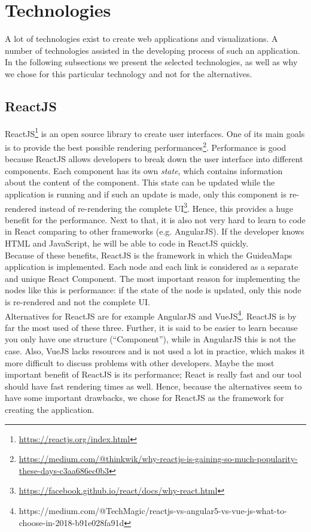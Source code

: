 \section{Technologies}\label{sec:technologies}
A lot of technologies exist to create web applications and visualizations. A number of technologies assisted in the developing process of such an application. In the following subsections we present the selected technologies, as well as why we chose for this particular technology and not for the alternatives.

\subsection{ReactJS}\label{sec:reactjs}
ReactJS\footnote{\url{https://reactjs.org/index.html}} is an open source library to create user interfaces. One of its main goals is to provide the best possible rendering performances\footnote{\url{https://medium.com/@thinkwik/why-reactjs-is-gaining-so-much-popularity-these-days-c3aa686ec0b3}}. Performance is good because ReactJS allows developers to break down the user interface into different components. Each component has its own \textit{state}, which contains information about the content of the component. This state can be updated while the application is running and if such an update is made, only this component is re-rendered instead of re-rendering the complete UI\footnote{\url{https://facebook.github.io/react/docs/why-react.html}}. Hence, this provides a huge benefit for the performance. Next to that, it is also not very hard to learn to code in React comparing to other frameworks (e.g. AngularJS). If the developer knows HTML and JavaScript, he will be able to code in ReactJS quickly.\\

Because of these benefits, ReactJS is the framework in which the GuideaMaps application is implemented. Each node and each link is considered as a separate and unique React Component. The most important reason for implementing the nodes like this is performance: if the state of the node is updated, only this node is re-rendered and not the complete UI.\\

Alternatives for ReactJS are for example AngularJS and VueJS\footnote{https://medium.com/@TechMagic/reactjs-vs-angular5-vs-vue-js-what-to-choose-in-2018-b91e028fa91d}. ReactJS is by far the most used of these three. Further, it is said to be easier to learn because you only have one structure (``Component''), while in AngularJS this is not the case. Also, VueJS lacks resources and is not used a lot in practice, which makes it more difficult to discuss problems with other developers. Maybe the most important benefit of ReactJS is its performance; React is really fast and our tool should have fast rendering times as well. Hence, because the alternatives seem to have some important drawbacks, we chose for ReactJS as the framework for creating the application. 

